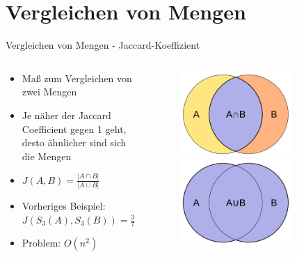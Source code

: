 \section{Vergleichen von Mengen}

\begin{frame}{Vergleichen von Mengen - Jaccard-Koeffizient}
    \begin{columns} %
        \begin{column}{.60\textwidth}
            \begin{itemize}
                \item Maß zum Vergleichen von zwei Mengen \pause
                \item Je näher der Jaccard Coefficient gegen 1 geht, desto ähnlicher sind sich die Mengen \pause
                \item $ J(A,B) = \frac{ | A \cap B | }{ | A \cup B | } $ \pause
                \item Vorheriges Beispiel: $ J(S_3(A),S_3(B)) = \frac{3}{7} \approx 0.43 $ \pause
                \item Problem: $ O(n^2) $ \pause
            \end{itemize}
        \end{column}
        \hfill
        \begin{column}{.40\textwidth}
            \begin{figure}[H]
                \centering
                \includegraphics[width=0.75\textwidth]{images/Intersection_of_sets_A_and_B.png} 
                \includegraphics[width=0.75\textwidth]{images/Union_of_sets_A_and_B.png}

\end{figure}
\end{column}
\end{columns}
\end{frame}
